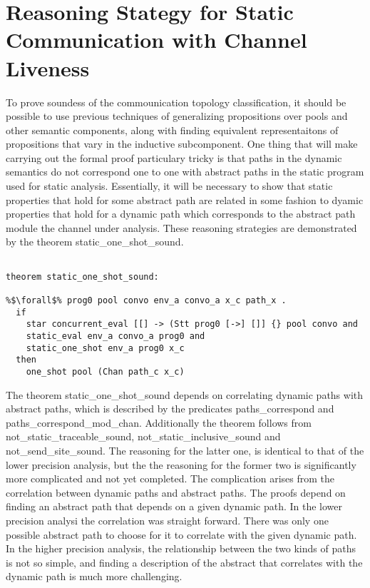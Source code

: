 \documentclass{article}
\begin{document}
\section{Reasoning Stategy for Static Communication with Channel Liveness}
To prove soundess of the commounication topology classification, it should be possible to use
previous techniques of generalizing propositions over pools and other semantic components,
along with finding equivalent representaitons of propositions that vary in the inductive
subcomponent. One thing that will make carrying out the formal proof particulary tricky is
that paths in the dynamic semantics do not correspond one to one with abstract paths in the
static program used for static analysis.  Essentially, it will be necessary to show that static
properties that hold for some abstract path are related in some fashion to dyamic properties
that hold for a dynamic path which corresponds to the abstract path module the channel under
analysis.  These reasoning strategies are demonstrated by the theorem static\_one\_shot\_sound. 


\begin{lstlisting}[language=logic, escapechar=\%]

theorem static_one_shot_sound:

%$\forall$% prog0 pool convo env_a convo_a x_c path_x . 
  if
    star concurrent_eval [[] -> (Stt prog0 [->] []] {} pool convo and
    static_eval env_a convo_a prog0 and
    static_one_shot env_a prog0 x_c
  then 
    one_shot pool (Chan path_c x_c)

  \end{lstlisting}

The theorem static\_one\_shot\_sound depends on correlating dynamic paths with abstract paths,
which is described by the predicates paths\_correspond and paths\_correspond\_mod\_chan.
Additionally the theorem follows from not\_static\_traceable\_sound,
not\_static\_inclusive\_sound and not\_send\_site\_sound.  The reasoning for the latter one, is
identical to that of the lower precision analysis, but the the reasoning for the former two is
significantly more complicated and not yet completed.  The complication arises from the
correlation between dynamic paths and abstract paths.  The proofs depend on finding an abstract
path that depends on a given dynamic path.  In the lower precision analysi the
correlation was straight forward.  There was only one possible abstract path to choose for it
to correlate with the given dynamic path.  In the higher precision analysis, the relationship
between the two kinds of paths is not so simple, and finding a description of the abstract
that correlates with the dynamic path is much more challenging.  
\end{document}
